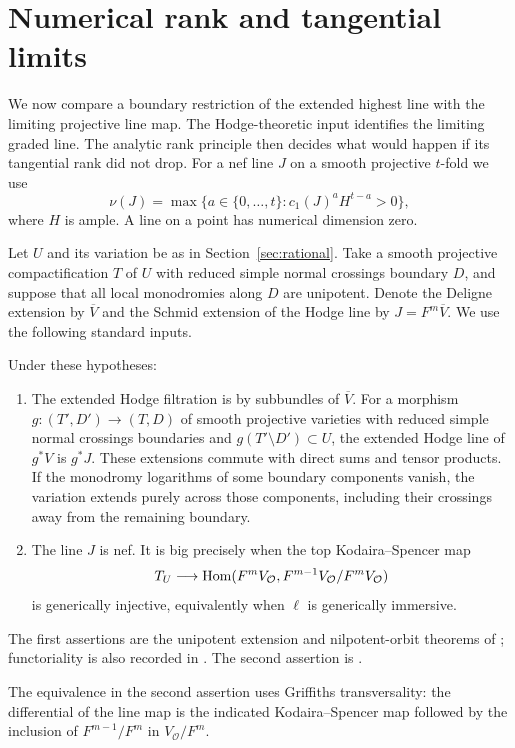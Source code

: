 \section{Numerical rank and tangential limits}\label{sec:limits}
We now compare a boundary restriction of the extended highest line
with the limiting projective line map. The Hodge-theoretic input
identifies the limiting graded line. The analytic rank principle
then decides what would happen if its tangential rank did not drop.
For a nef line $J$ on a smooth projective $t$-fold we use
\[
 \nu(J)=\max\{a\in\{0,\ldots,t\}:c_1(J)^aH^{t-a}>0\},
\]
where $H$ is ample. A line on a point has numerical dimension zero.

Let $U$ and its variation be as in Section~\ref{sec:rational}.
Take a smooth projective compactification $T$ of $U$ with reduced
simple normal crossings boundary $D$, and suppose that all local
monodromies along $D$ are unipotent. Denote the Deligne extension by
$\overline V$ and the Schmid extension of the Hodge line by
$J=F^m\overline V$. We use the following standard inputs.

\begin{theorem}\label{altord:h:inputs}
Under these hypotheses:
\begin{enumerate}
\item The extended Hodge filtration is by subbundles of $\overline V$.
For a morphism $g:(T',D')\to(T,D)$ of smooth projective varieties
with reduced simple normal crossings boundaries and
$g(T'\setminus D')\subset U$, the extended Hodge line of $g^*V$
is $g^*J$. These extensions commute with direct sums and tensor products.
If the monodromy logarithms of some boundary components vanish, the
variation extends purely across those components, including their
crossings away from the remaining boundary.
\item The line $J$ is nef. It is big precisely when the top
Kodaira--Spencer map
\[
 T_U\longrightarrow
 \operatorname{Hom}(F^mV_{\mathcal O},F^{m-1}V_{\mathcal O}/F^mV_{\mathcal O})
\]
is generically injective, equivalently when $\ell$ is generically
immersive.
\end{enumerate}
The first assertions are the unipotent extension and nilpotent-orbit
theorems of \cite{Schmid,CKS}; functoriality is also recorded in
\cite[Lemmas~2.16 and~5.6]{BFMT}. The second assertion is
\cite[Lemma~6.17]{BakkerBrunebarbeTsimerman}.
\end{theorem}

The equivalence in the second assertion uses Griffiths transversality:
the differential of the line map is the indicated Kodaira--Spencer
map followed by the inclusion of $F^{m-1}/F^m$ in $V_{\mathcal O}/F^m$.


